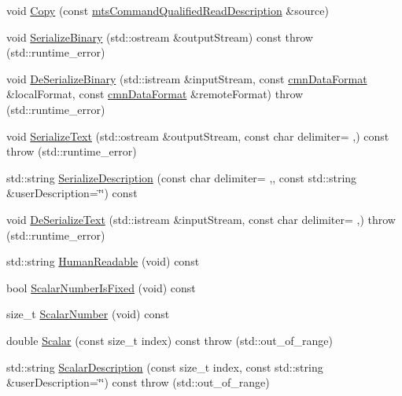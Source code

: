 \begin{DoxyCompactItemize}
\item 
void \hyperlink{classmts_command_qualified_read_description_ad4813008aa25d86b8ef7a8356855de6a}{Copy} (const \hyperlink{classmts_command_qualified_read_description}{mts\+Command\+Qualified\+Read\+Description} \&source)
\item 
void \hyperlink{classmts_command_qualified_read_description_a1ac3ea15ff829214a4574777a5d6b5e7}{Serialize\+Binary} (std\+::ostream \&output\+Stream) const   throw (std\+::runtime\+\_\+error)
\item 
void \hyperlink{classmts_command_qualified_read_description_a0e980bbf3eb9dfd2b6d70641247a9cd2}{De\+Serialize\+Binary} (std\+::istream \&input\+Stream, const \hyperlink{classcmn_data_format}{cmn\+Data\+Format} \&local\+Format, const \hyperlink{classcmn_data_format}{cmn\+Data\+Format} \&remote\+Format)  throw (std\+::runtime\+\_\+error)
\item 
void \hyperlink{classmts_command_qualified_read_description_a722d5af1bfa92ed45e5c40e58d84ba0f}{Serialize\+Text} (std\+::ostream \&output\+Stream, const char delimiter= \textquotesingle{},\textquotesingle{}) const   throw (std\+::runtime\+\_\+error)
\item 
std\+::string \hyperlink{classmts_command_qualified_read_description_aa976e69bfc37a8c8eeaad129b6ef8e81}{Serialize\+Description} (const char delimiter= \textquotesingle{},\textquotesingle{}, const std\+::string \&user\+Description=\char`\"{}\char`\"{}) const 
\item 
void \hyperlink{classmts_command_qualified_read_description_a8d05bf0b2b243f064448632720017a0a}{De\+Serialize\+Text} (std\+::istream \&input\+Stream, const char delimiter= \textquotesingle{},\textquotesingle{})  throw (std\+::runtime\+\_\+error)
\item 
std\+::string \hyperlink{classmts_command_qualified_read_description_a935c688d1dbdd459e8bdba27790cd56b}{Human\+Readable} (void) const 
\item 
bool \hyperlink{classmts_command_qualified_read_description_a167e9db3f2c6251c99aa9f250c3529ed}{Scalar\+Number\+Is\+Fixed} (void) const 
\item 
size\+\_\+t \hyperlink{classmts_command_qualified_read_description_a16ecbbdfe1dacba9d2feccfc9c890439}{Scalar\+Number} (void) const 
\item 
double \hyperlink{classmts_command_qualified_read_description_ac9d25daa0ad5d5681c1128cba7bd4b7f}{Scalar} (const size\+\_\+t index) const   throw (std\+::out\+\_\+of\+\_\+range)
\item 
std\+::string \hyperlink{classmts_command_qualified_read_description_a22b8e1b2efb943978caedc32fabc435b}{Scalar\+Description} (const size\+\_\+t index, const std\+::string \&user\+Description=\char`\"{}\char`\"{}) const   throw (std\+::out\+\_\+of\+\_\+range)
\end{DoxyCompactItemize}
